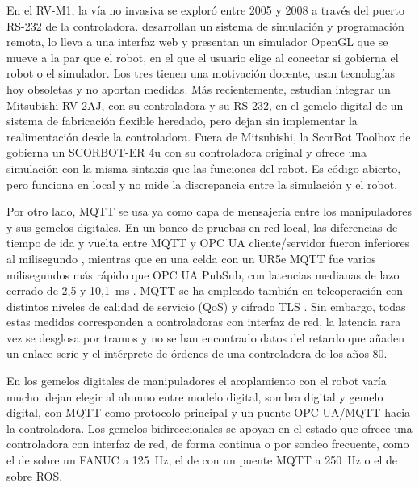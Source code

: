 En el RV-M1, la vía no invasiva se exploró entre 2005 y 2008 a través del puerto RS-232 de la controladora. \citet{swider2007system} desarrollan un sistema de simulación y programación remota, \citet{foit2008web} lo lleva a una interfaz web y \citet{mihali2005effective} presentan un simulador OpenGL que se mueve a la par que el robot, en el que el usuario elige al conectar si gobierna el robot o el simulador. Los tres tienen una motivación docente, usan tecnologías hoy obsoletas y no aportan medidas. Más recientemente, \citet{patrao2025understanding} estudian integrar un Mitsubishi RV-2AJ, con su controladora y su RS-232, en el gemelo digital de un sistema de fabricación flexible heredado, pero dejan sin implementar la realimentación desde la controladora. Fuera de Mitsubishi, la ScorBot Toolbox de \citet{kutzer2023scorbot} gobierna un SCORBOT-ER 4u con su controladora original y ofrece una simulación con la misma sintaxis que las funciones del robot. Es código abierto, pero funciona en local y no mide la discrepancia entre la simulación y el robot.

Por otro lado, MQTT se usa ya como capa de mensajería entre los manipuladores y sus gemelos digitales. En un banco de pruebas en red local, las diferencias de tiempo de ida y vuelta entre MQTT y OPC UA cliente/servidor fueron inferiores al milisegundo \citep{profanter2019opcua}, mientras que en una celda con un UR5e MQTT fue varios milisegundos más rápido que OPC UA PubSub, con latencias medianas de lazo cerrado de 2,5 y 10,1~ms \citep{ariascachero2023operational}. MQTT se ha empleado también en teleoperación con distintos niveles de calidad de servicio (QoS) y cifrado TLS \citep{luu2025enhancing}. Sin embargo, todas estas medidas corresponden a controladoras con interfaz de red, la latencia rara vez se desglosa por tramos \citep{bray2024latency} y no se han encontrado datos del retardo que añaden un enlace serie y el intérprete de órdenes de una controladora de los años 80.

En los gemelos digitales de manipuladores el acoplamiento con el robot varía mucho. \citet{kaarlela2023digital} dejan elegir al alumno entre modelo digital, sombra digital y gemelo digital, con MQTT como protocolo principal y un puente OPC UA/MQTT hacia la controladora.  Los gemelos bidireccionales se apoyan en el estado que ofrece una controladora con interfaz de red, de forma continua o por sondeo frecuente, como el de \citet{chang2025construction} sobre un FANUC a 125~Hz, el de \citet{liang2020bidirectional} con un puente MQTT a 250~Hz o el de \citet{singh2024unity} sobre ROS.

